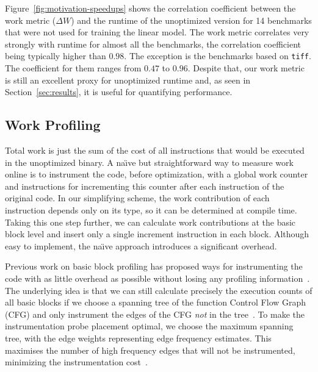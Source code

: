 
    Figure~\ref{fig:motivation-speedups} shows the correlation coefficient between the work metric ($\Delta W$) and the runtime of the
    unoptimized version for 14 benchmarks that were not used for training the linear model. The work metric correlates very strongly with
    runtime for almost all the benchmarks, the correlation coefficient being typically higher than $0.98$. The exception is the benchmarks
    based on \texttt{tiff}. The coefficient for them ranges from $0.47$ to $0.96$. Despite that, our work metric is still an excellent proxy
    for unoptimized runtime and, as seen in Section~\ref{sec:results}, it is useful for quantifying performance.


    \subsection{Work Profiling}\label{subsec:prof}

    Total work is just the sum of the cost of all instructions that would be executed in the unoptimized binary. A na\"{\i}ve but
    straightforward way to measure work online is to instrument the code, before optimization, with a global work counter and instructions for
    incrementing this counter after each instruction of the original code. In our simplifying scheme, the work contribution of each instruction depends only on
    its type, so it can be determined at compile time. Taking this one step further, we can calculate work contributions at the basic block
    level and insert only a single increment instruction in each block. Although easy to implement, the na\"{\i}ve approach introduces a
    significant overhead.

    Previous work on basic block profiling has proposed ways for instrumenting the code with as little overhead as possible without losing
    any profiling information~\cite{knuth73,ball94}. The underlying idea is that we can still calculate precisely the execution counts of
    all basic blocks if we choose a spanning tree of the function Control Flow Graph (CFG) and only instrument the edges of the CFG
    \textit{not} in the tree~\cite{nahapetian73,forman81}. To make the instrumentation probe placement optimal, we choose the maximum
    spanning tree, with the edge weights representing edge frequency estimates. This maximises the number of high frequency edges that will
    not be instrumented, minimizing the instrumentation cost~\cite{forman81,ball94}.

